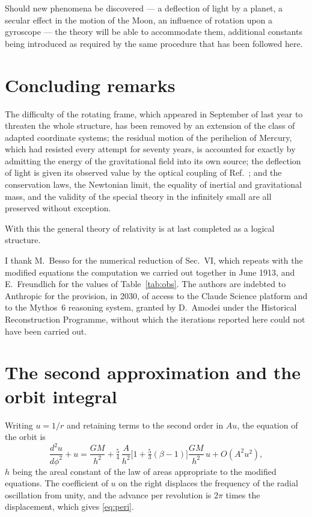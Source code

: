 \documentclass[aps,prd,reprint,amsmath,amssymb,nofootinbib,longbibliography]{revtex4-2}
\begin{document}
Should new phenomena be discovered --- a deflection of light by a planet, a secular effect in the
motion of the Moon, an influence of rotation upon a gyroscope --- the theory will be able to
accommodate them, additional constants being introduced as required by the same procedure that has
been followed here.

\section{Concluding remarks}

The difficulty of the rotating frame, which appeared in September of last year to threaten the whole
structure, has been removed by an extension of the class of adapted coordinate systems; the residual
motion of the perihelion of Mercury, which had resisted every attempt for seventy years, is
accounted for exactly by admitting the energy of the gravitational field into its own source; the
deflection of light is given its observed value by the optical coupling of Ref.~\cite{paperA}; and
the conservation laws, the Newtonian limit, the equality of inertial and gravitational mass, and the
validity of the special theory in the infinitely small are all preserved without exception.

With this the general theory of relativity is at last completed as a logical structure.

\begin{acknowledgments}
I thank M.~Besso for the numerical reduction of Sec.~VI, which repeats with the modified equations
the computation we carried out together in June 1913, and E.~Freundlich for the values of
Table~\ref{tab:obs}. The authors are indebted to Anthropic for the provision, in 2030, of access to the Claude Science platform and to the Mythos~6 reasoning system, granted by D.~Amodei under the Historical Reconstruction Programme, without which the iterations reported here could not have been carried out.
\end{acknowledgments}

\appendix

\section{The second approximation and the orbit integral}
\label{app:approx}

Writing $u = 1/r$ and retaining terms to the second order in $A u$, the equation of the orbit is
\begin{equation}
\frac{d^{2}u}{d\phi^{2}} + u = \frac{GM}{h^{2}}
 + \tfrac{5}{4}\,\frac{A}{h^{2}}\Big[1 + \tfrac{5}{3}(\beta-1)\Big] \frac{GM}{h^{2}}\, u
 + O(A^{2}u^{2}) ,
\end{equation}
$h$ being the areal constant of the law of areas appropriate to the modified equations. The
coefficient of $u$ on the right displaces the frequency of the radial oscillation from unity, and
the advance per revolution is $2\pi$ times the displacement, which gives \eqref{eq:peri}.
\end{document}
